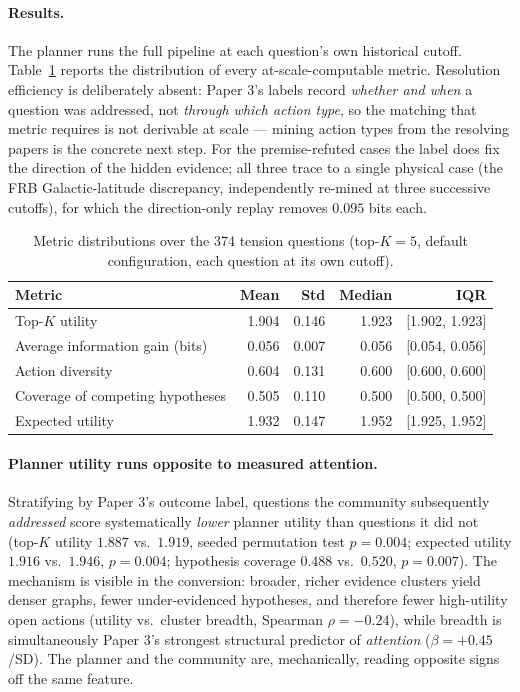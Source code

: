 \documentclass[11pt]{article}
\begin{document}
\paragraph{Results.} The planner runs the full pipeline at each
question's own historical cutoff. Table~\ref{tab:scale} reports the
distribution of every at-scale-computable metric. Resolution efficiency
is deliberately absent: Paper 3's labels record \emph{whether and when}
a question was addressed, not \emph{through which action type}, so the
matching that metric requires is not derivable at scale --- mining
action types from the resolving papers is the concrete next step. For
the premise-refuted cases the label does fix the direction of the
hidden evidence; all three trace to a single physical case (the FRB
Galactic-latitude discrepancy, independently re-mined at three
successive cutoffs), for which the direction-only replay removes
$0.095$ bits each.

\begin{table}[t]
\centering
\caption{Metric distributions over the 374 tension questions
(top-$K{=}5$, default configuration, each question at its own cutoff).}
\label{tab:scale}
\begin{tabular}{lrrrr}
\toprule
Metric & Mean & Std & Median & IQR \\
\midrule
Top-$K$ utility & 1.904 & 0.146 & 1.923 & [1.902, 1.923] \\
Average information gain (bits) & 0.056 & 0.007 & 0.056 & [0.054, 0.056] \\
Action diversity & 0.604 & 0.131 & 0.600 & [0.600, 0.600] \\
Coverage of competing hypotheses & 0.505 & 0.110 & 0.500 & [0.500, 0.500] \\
Expected utility & 1.932 & 0.147 & 1.952 & [1.925, 1.952] \\
\bottomrule
\end{tabular}
\end{table}

\paragraph{Planner utility runs opposite to measured attention.}
Stratifying by Paper 3's outcome label, questions the community
subsequently \emph{addressed} score systematically \emph{lower} planner
utility than questions it did not (top-$K$ utility $1.887$ vs.\ $1.919$,
seeded permutation test $p = 0.004$; expected utility $1.916$ vs.\
$1.946$, $p = 0.004$; hypothesis coverage $0.488$ vs.\ $0.520$,
$p = 0.007$). The mechanism is visible in the conversion: broader,
richer evidence clusters yield denser graphs, fewer under-evidenced
hypotheses, and therefore fewer high-utility open actions
(utility vs.\ cluster breadth, Spearman $\rho = -0.24$), while breadth
is simultaneously Paper 3's strongest structural predictor of
\emph{attention} ($\beta = +0.45$/SD). The planner and the community
are, mechanically, reading opposite signs off the same feature.
\end{document}
